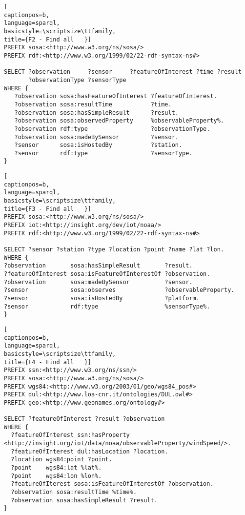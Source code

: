 \newpage
\begin{lstlisting}[
captionpos=b, 
language=sparql,
basicstyle=\scriptsize\ttfamily,
title={F2 - Find all   }]
PREFIX sosa:<http://www.w3.org/ns/sosa/>
PREFIX rdf:<http://www.w3.org/1999/02/22-rdf-syntax-ns#>

SELECT ?observation     ?sensor     ?featureOfInterest ?time ?result 
       ?observationType ?sensorType 
WHERE {
   ?observation sosa:hasFeatureOfInterest ?featureOfInterest.
   ?observation sosa:resultTime           ?time.
   ?observation sosa:hasSimpleResult      ?result.
   ?observation sosa:observedProperty     %observableProperty%.
   ?observation rdf:type                  ?observationType.
   ?observation sosa:madeBySensor         ?sensor.
   ?sensor      sosa:isHostedBy           ?station.
   ?sensor      rdf:type                  ?sensorType.
}
\end{lstlisting}
\begin{lstlisting}[
captionpos=b, 
language=sparql,
basicstyle=\scriptsize\ttfamily,
title={F3 - Find all   }]
PREFIX sosa:<http://www.w3.org/ns/sosa/>
PREFIX iot:<http://insight.org/dev/iot/noaa/>
PREFIX rdf:<http://www.w3.org/1999/02/22-rdf-syntax-ns#>

SELECT ?sensor ?station ?type ?location ?point ?name ?lat ?lon.
WHERE { 
?observation       sosa:hasSimpleResult       ?result.
?featureOfInterest sosa:isFeatureOfInterestOf ?observation.
?observation       sosa:madeBySensor          ?sensor.
?sensor            sosa:observes              ?observableProperty.
?sensor            sosa:isHostedBy            ?platform.
?sensor            rdf:type                   %sensorType%.
}
\end{lstlisting}
\begin{lstlisting}[
captionpos=b, 
language=sparql,
basicstyle=\scriptsize\ttfamily,
title={F4 - Find all   }]
PREFIX ssn:<http://www.w3.org/ns/ssn/>
PREFIX sosa:<http://www.w3.org/ns/sosa/>
PREFIX wgs84:<http://www.w3.org/2003/01/geo/wgs84_pos#>
PREFIX dul:<http://www.loa-cnr.it/ontologies/DUL.owl#>
PREFIX geo:<http://www.geonames.org/ontology#>

SELECT ?featureOfInterest ?result ?observation
WHERE { 
  ?featureOfInterest ssn:hasProperty <http://insight.org/iot/data/noaa/observableProperty/windSpeed/>.
  ?featureOfInterest dul:hasLocation ?location.
  ?location wgs84:point ?point.
  ?point    wgs84:lat %lat%.
  ?point    wgs84:lon %lon%.
  ?featureOfIterest sosa:isFeatureOfInterestOf ?observation.
  ?observation sosa:resultTime %time%.
  ?observation sosa:hasSimpleResult ?result.
}
\end{lstlisting}
